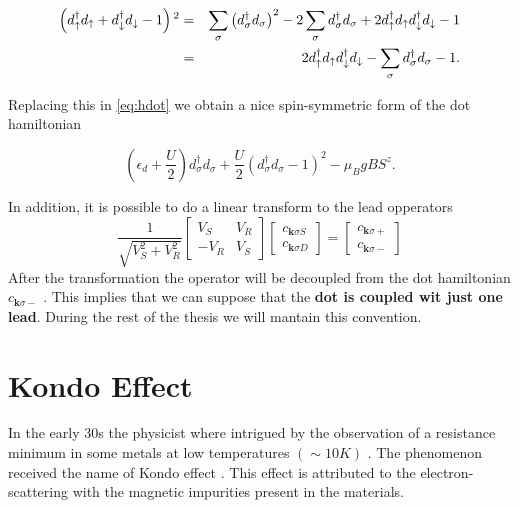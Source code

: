 \begin{eqnarray*}
\left(d_{\uparrow}^{\dagger}d_{\uparrow}+d_{\downarrow}^{\dagger}d_{\downarrow}-1\right){}^{2} & = & \sum_{\sigma}\left(d_{\sigma}^{\dagger}d_{\sigma}\right)^{2}-2\sum_{\sigma}d_{\sigma}^{\dagger}d_{\sigma}+2d_{\uparrow}^{\dagger}d_{\uparrow}d_{\downarrow}^{\dagger}d_{\downarrow}-1\\
 & = & 2d_{\uparrow}^{\dagger}d_{\uparrow}d_{\downarrow}^{\dagger}d_{\downarrow}-\sum_{\sigma}d_{\sigma}^{\dagger}d_{\sigma}-1.
\end{eqnarray*}

Replacing this in \eqref{eq:hdot} we obtain a  nice spin-symmetric form of the dot hamiltonian

\begin{equation}
    \left(\epsilon_{d}+\frac{U}{2}\right)d_{\sigma}^{\dagger}d_{\sigma}+\frac{U}{2}(d_{\sigma}^{\dagger}d_{\sigma}-1)^{2}-\mu_{B}gBS^{z}. 
    \label{eq:hdot2}
\end{equation}

In addition, it is possible to do a linear transform to the lead opperators 
\begin{equation}
    \frac{1}{\sqrt{V_{S}^{2}+V_{R}^{2}}}\left[\begin{array}{cc}
V_{S} & V_{R}\\
-V_{R} & V_{S}
\end{array}\right]\left[\begin{array}{c}
c_{\mathbf{k}\sigma S}\\
c_{\mathbf{k}\sigma D}
\end{array}\right]=\left[\begin{array}{c}
c_{\mathbf{k}\sigma+}\\
c_{\mathbf{k}\sigma-}
\end{array}\right]
\end{equation}
After the transformation the operator will be decoupled from the dot hamiltonian $c_{\mathbf{k}\sigma-}$ . This implies that we can suppose that the  \textbf{dot is coupled wit just one lead}. During the rest of the thesis we will mantain this convention. 


\section{Kondo Effect}

In the early 30s the physicist where intrigued by the observation of a resistance minimum in some metals at low temperatures $(\sim 10K)$ \cite{sindel_numerical_2005} . The phenomenon received the name of Kondo effect \citep{hewson_kondo_1997}. This effect is attributed to the electron-scattering with the magnetic impurities present in the materials. 

